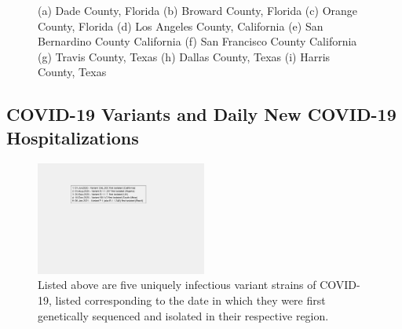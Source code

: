 \documentclass[]{article}
\begin{document}
\begin{figure}
	\caption{(a) Dade County, Florida (b) Broward County, Florida (c) Orange County, Florida (d) Los Angeles County, California (e) San Bernardino County California (f) San Francisco County California (g) Travis County, Texas (h) Dallas County, Texas (i) Harris County, Texas}
	\label{fig:foobar}
\end{figure}

\FloatBarrier
\vspace{5mm}
\subsection{COVID-19 Variants and Daily New COVID-19 Hospitalizations}

\begin{figure}[!h]
	\centering
	\includegraphics[width=0.50\textwidth]{legends/variant_strains_legend.png}
	\caption{Listed above are five uniquely infectious variant strains of COVID-19,  listed corresponding to the date in which they were first genetically sequenced and isolated in their respective region.}
	\label{fig:legends/variant_strains_legendLabel}
\end{figure}
\end{document}

